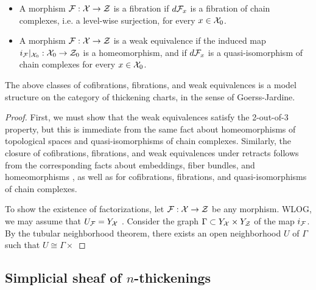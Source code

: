 \begin{definition}
\begin{itemize}
\item A morphism $\mathcal F : \mathcal X \to \mathcal Z$ is a fibration if $d \mathcal F_x$ is a fibration of chain complexes, i.e. a level-wise surjection, for every $x \in \mathcal X_0$.

\item A morphism $\mathcal F : \mathcal X \to \mathcal Z$ is a weak equivalence if the induced map ${i_\mathcal F|_{\mathcal X_0}}: \mathcal X_0 \to \mathcal Z_0$ is a homeomorphism, and if $d \mathcal F_x$ is a quasi-isomorphism of chain complexes for every $x \in \mathcal X_0$.

\end{itemize}
\end{definition}

\begin{prop}\label{model-structure}
The above classes of cofibrations, fibrations, and weak equivalences is a model structure on the category of thickening charts, in the sense of Goerss-Jardine.  
\end{prop}

\begin{proof}

First, we must show that the weak equivalences satisfy the 2-out-of-3 property, but this is immediate from the same fact about homeomorphisms of topological spaces and quasi-isomorphisms of chain complexes. Similarly, the closure of cofibrations, fibrations, and weak equivalences under retracts follows from the corresponding facts about embeddings, fiber bundles, and homeomorphisms , as well as for cofibrations, fibrations, and quasi-isomorphisms of chain complexes.

To show the existence of factorizations, let $\mathcal F: \mathcal X \to \mathcal Z$ be any morphism. WLOG, we may assume that $U_\mathcal F = Y_\mathcal X$ . Consider the graph $\Gamma \subset Y_\mathcal X \times Y_\mathcal Z$ of the map $i_\mathcal F$. By the tubular neighborhood theorem, there exists an open neighborhood $U$ of $\Gamma$ such that $U \cong \Gamma \times $

\end{proof}

\subsection{Simplicial sheaf of $n$-thickenings}

